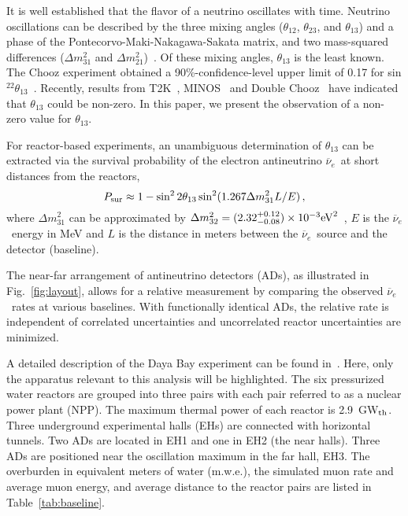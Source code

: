 \documentclass[aps,prl,showpacs,showkeys,amsmath,amssymb,
twocolumn,
floatfix,
superscriptaddress
]{revtex4-1}
\newcommand{\nuebar}{$\overline{\nu}_{e}$}
\begin{document}
\maketitle



\par
It is well established that the flavor of a neutrino oscillates with time. Neutrino oscillations can be described by the three mixing angles ($\theta_{12}$, $\theta_{23}$, and $\theta_{13}$) and a phase of the
Pontecorvo-Maki-Nakagawa-Sakata matrix, and two mass-squared
differences ($\Delta m^2_{31}$ and $\Delta m^2_{21}$)~\cite{pontecorvo,mns}.
Of these mixing angles, $ \theta_{13}$ is the least
known. The Chooz experiment obtained a 90\%-confidence-level upper limit of 0.17 for
sin$^22\theta_{13}$~\cite{chooz}.
Recently, results from T2K~\cite{t2k}, MINOS~\cite{minosth13} and Double Chooz~\cite{dchooz}
have indicated that $\theta_{13}$ could be non-zero.
In this paper, we present the observation of a non-zero value for $\theta_{13}$.

\par
For reactor-based experiments, an unambiguous determination of $\theta_{13}$
can be extracted via the survival probability of the electron antineutrino \nuebar\ at short distances from the reactors,
\begin{equation}\label{eqn:psurv}
P_{\rm sur} \approx 1 - \sin^2 2\theta_{13} \sin^2 (1.267 \Delta m^2_{31}  L/E) \,,
\end{equation}
where $\Delta m^2_{31}$ can be approximated by $\Delta m^2_{32}=(2.32^{+0.12}_{-0.08}) \times 10^{-3} {\rm eV}^2$~\cite{minosdm},
$E$ is the \nuebar\ energy in MeV and $L$ is the distance in meters between
the \nuebar\ source and the detector (baseline).

\par
The near-far arrangement of antineutrino detectors (ADs), as illustrated in Fig.~\ref{fig:layout}, allows for a relative
measurement by comparing the observed \nuebar\ rates at various baselines.
With functionally identical ADs, the relative rate is independent of correlated uncertainties and uncorrelated reactor uncertainties are minimized.

\par
A detailed description of the Daya Bay experiment can be found in~\cite{ad12,dyb}.
Here, only the apparatus relevant to this analysis will be highlighted.
The six pressurized water reactors are grouped into three pairs with
each pair referred to as a nuclear power plant (NPP)\@.
The maximum thermal power of each reactor is 2.9~GW$_{\rm th}$\@.
Three underground experimental halls (EHs) are
connected with horizontal tunnels. Two ADs are located in EH1 and one
in EH2 (the near halls). Three ADs are positioned near the oscillation maximum in the far hall, EH3. The overburden in equivalent meters of water (m.w.e.), the simulated muon rate and average muon energy, and average distance to the reactor pairs are listed in
Table~\ref{tab:baseline}.
\end{document}
